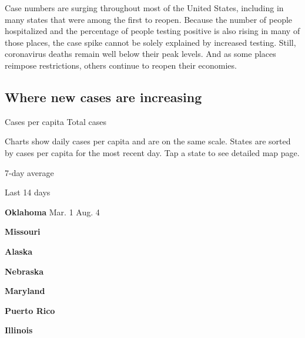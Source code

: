 Case numbers are surging throughout most of the United States, including
in many states that were among the first to reopen. Because the number
of people hospitalized and the percentage of people testing positive is
also rising in many of those places, the case spike cannot be solely
explained by increased testing. Still, coronavirus deaths remain well
below their peak levels. And as some places reimpose restrictions,
others continue to reopen their economies.

\hypertarget{where-new-cases-are-increasing}{%
\subsection{Where new cases are
increasing}\label{where-new-cases-are-increasing}}

Cases per capita Total cases

Charts show daily cases per capita and are on the same scale. States are
sorted by cases per capita for the most recent day. Tap a state to see
detailed map page.

\href{https://www.nytimes3xbfgragh.onion/interactive/2020/us/oklahoma-coronavirus-cases.html}{}

7-day average

Last 14 days

\textbf{Oklahoma} Mar. 1 Aug. 4

\href{https://www.nytimes3xbfgragh.onion/interactive/2020/us/missouri-coronavirus-cases.html}{}

\textbf{Missouri}

\href{https://www.nytimes3xbfgragh.onion/interactive/2020/us/alaska-coronavirus-cases.html}{}

\textbf{Alaska}

\href{https://www.nytimes3xbfgragh.onion/interactive/2020/us/nebraska-coronavirus-cases.html}{}

\textbf{Nebraska}

\href{https://www.nytimes3xbfgragh.onion/interactive/2020/us/maryland-coronavirus-cases.html}{}

\textbf{Maryland}

\href{https://www.nytimes3xbfgragh.onion/interactive/2020/us/puerto-rico-coronavirus-cases.html}{}

\textbf{Puerto Rico}

\href{https://www.nytimes3xbfgragh.onion/interactive/2020/us/illinois-coronavirus-cases.html}{}

\textbf{Illinois}

